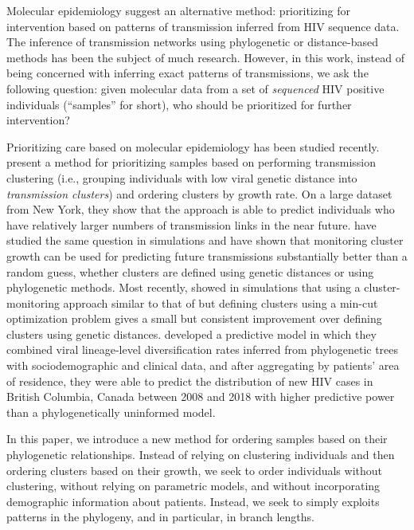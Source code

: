\documentclass[a4paper,11pt]{article}
\newcommand{\authorcite}[1]{\citeauthor{#1}\supercite{#1}}
\newcommand{\PLWH}{sample\xspace}
\begin{document}
Molecular epidemiology suggest an alternative method:
prioritizing  for intervention  based on patterns of transmission inferred from HIV sequence data.\supercite{Bbosa2019,Villandre2019,Oster2018,Ragonnet-Cronin2019,Wertheim2018,Wertheim2011,Wertheim2014,Smith2009}
The inference of transmission networks using phylogenetic or distance-based methods has been the subject of much research.\supercite{Leitner2018,Pond2018,Ragonnet-Cronin2013,Prosperi2011}
However, in this work, instead of being concerned with inferring exact patterns of transmissions, we ask the following question:
given molecular data from a set of \textit{sequenced} HIV positive individuals (``\PLWH{s}'' for short), %
who should be prioritized for further intervention? 

Prioritizing care based on molecular epidemiology has been studied recently. 
\authorcite{Wertheim2018} present a method for prioritizing \PLWH{s} based on performing transmission clustering (i.e., grouping individuals with low viral genetic distance into \textit{transmission clusters}) and ordering clusters  by growth rate.
On a large dataset from New York, they show that the approach is able to predict individuals who have relatively larger numbers of transmission links in the near future.
\authorcite{Moshiri2018} have studied the same question in simulations and have shown that monitoring cluster growth can be used for predicting future transmissions substantially better than a random guess, whether clusters are defined using genetic distances or using phylogenetic methods. 
Most recently, \authorcite{Balaban2019}  showed in simulations that using a cluster-monitoring approach similar to that of \authorcite{Wertheim2018}  but defining clusters  using a min-cut optimization problem gives a small but consistent improvement over defining clusters using genetic distances. 
\authorcite{McLaughlin2019} developed a predictive model in which they combined viral lineage-level diversification rates inferred from phylogenetic trees with sociodemographic and clinical data, and after aggregating by patients' area of residence, they were able to predict the distribution of new HIV cases in British Columbia, Canada between 2008 and 2018 with higher predictive power than a phylogenetically uninformed model.

In this paper, we introduce a new method for ordering \PLWH{s} based  on their phylogenetic relationships. Instead of relying on clustering individuals and then ordering clusters based on their growth, we seek to order individuals without clustering, without relying on parametric models, and without incorporating demographic information about patients. 
Instead, we seek to simply exploits patterns in the phylogeny, and in particular, in branch lengths. 
\end{document}
